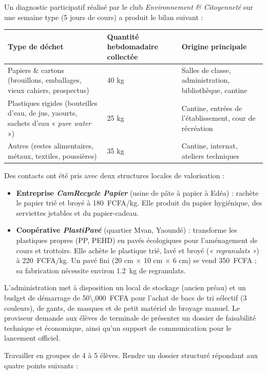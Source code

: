 \documentclass[11pt]{article}
\newcounter{popsec}
\newcounter{popsub}
\newcommand{\courssub}[1]{%
  \stepcounter{popsub}%
  \par\vspace{9pt}\noindent{\popxbold\fontsize{11.5}{13}\selectfont\color{popink}{\color{poporange}\thepopsec.\thepopsub}\hspace{6pt}#1}\par\nopagebreak\vspace{4pt}
}
\begin{document}
Un diagnostic participatif réalisé par le club \emph{Environnement \& Citoyenneté} sur une semaine type (5 jours de cours) a produit le bilan suivant :
\begin{center}
\begin{tabularx}{\linewidth}{|l|X|X|}\hline
\rowcolor{popblueL}
\textbf{Type de déchet} & \textbf{Quantité hebdomadaire collectée} & \textbf{Origine principale} \\ \hline
Papiers \& cartons (brouillons, emballages, vieux cahiers, prospectus) & 40 kg & Salles de classe, administration, bibliothèque, cantine \\ \hline
Plastiques rigides (bouteilles d'eau, de jus, yaourts, sachets d'eau « \emph{pure water} ») & 25 kg & Cantine, entrées de l'établissement, cour de récréation \\ \hline
Autres (restes alimentaires, métaux, textiles, poussières) & 35 kg & Cantine, internat, ateliers techniques \\ \hline
\end{tabularx}
\end{center}

\medskip
\noindent
Des contacts ont été pris avec deux structures locales de valorisation :
\begin{itemize}
\item \textbf{Entreprise \emph{CamRecycle Papier}} (usine de pâte à papier à Edéa) : rachète le papier trié et broyé à \SI{180}{FCFA/kg}. Elle produit du papier hygiénique, des serviettes jetables et du papier-cadeau.
\item \textbf{Coopérative \emph{PlastiPavé}} (quartier Mvan, Yaoundé) : transforme les plastiques propres (PP, PEHD) en pavés écologiques pour l'aménagement de cours et trottoirs. Elle achète le plastique trié, lavé et broyé (\emph{« regranulats »}) à \SI{220}{FCFA/kg}. Un pavé fini (20 cm $\times$ 10 cm $\times$ 6 cm) se vend \SI{350}{FCFA} ; sa fabrication nécessite environ \SI{1,2}{kg} de regranulats.
\end{itemize}

\medskip
\noindent
L'administration met à disposition un local de stockage (ancien préau) et un budget de démarrage de \SI{50\,000}{FCFA} pour l'achat de bacs de tri sélectif (3 couleurs), de gants, de masques et de petit matériel de broyage manuel. Le proviseur demande aux élèves de terminale de présenter un dossier de faisabilité technique et économique, ainsi qu'un support de communication pour le lancement officiel.

\courssub{Consignes}
Travailler en groupes de 4 à 5 élèves. Rendre un dossier structuré répondant aux quatre points suivants :
\end{document}
